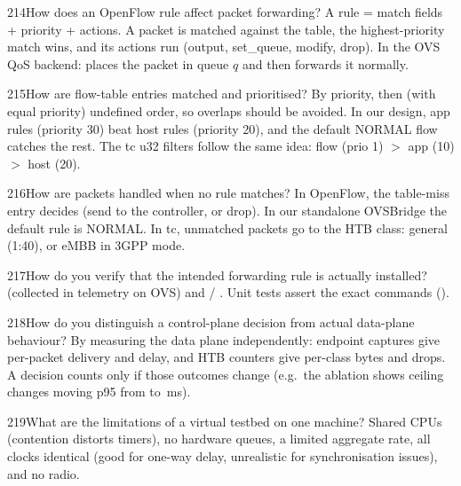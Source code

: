 \begin{qa}{214}{How does an OpenFlow rule affect packet forwarding?}
A rule = match fields + priority + actions. A packet is matched against the table, the highest-priority match wins,
and its actions run (output, set\_queue, modify, drop). In the OVS QoS backend:
 places the packet in queue $q$ and then forwards it
normally.
\end{qa}

\begin{qa}{215}{How are flow-table entries matched and prioritised?}
By priority, then (with equal priority) undefined order, so overlaps should be avoided. In our design, app rules
(priority 30) beat host rules (priority 20), and the default NORMAL flow catches the rest. The tc u32 filters follow
the same idea: flow (prio 1) $>$ app (10) $>$ host (20).
\end{qa}

\begin{qa}{216}{How are packets handled when no rule matches?}
In OpenFlow, the table-miss entry decides (send to the controller, or drop). In our standalone OVSBridge the default
rule is NORMAL. In tc, unmatched packets go to the HTB  class: general (1:40), or eMBB in 3GPP mode.
\end{qa}

\begin{qa}{217}{How do you verify that the intended forwarding rule is actually installed?}
 (collected in telemetry on OVS) and  / .
Unit tests assert the exact commands ().
\end{qa}

\begin{qa}{218}{How do you distinguish a control-plane decision from actual data-plane behaviour?}
By measuring the data plane independently: endpoint captures give per-packet delivery and delay, and HTB counters give
per-class bytes and drops. A decision counts only if those outcomes change (e.g.\ the ablation shows ceiling changes
moving p95 from \NAblSchoolFullHc{} to \NAblSchoolFullStrictHc\,ms).
\end{qa}

\begin{qa}{219}{What are the limitations of a virtual testbed on one machine?}
Shared CPUs (contention distorts timers), no hardware queues, a limited aggregate rate, all clocks identical (good for
one-way delay, unrealistic for synchronisation issues), and no radio.
\end{qa}

